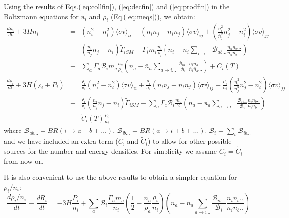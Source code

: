 \documentclass[preprint,notoc]{JHEP3}
\def\to{\rightarrow}
\def\to{\rightarrow}
\newcommand\Drv[2]{\frac{d #1}{d #2}}
\begin{document}
Using the results of Eqs.(\ref{eq:collfin}), (\ref{eq:decfin}) and
(\ref{eq:prodfin}) in the Boltzmann equations for $n_i$ and $\rho_i$
(Eq.(\ref{eq:meqs})), we obtain:
\begin{eqnarray}
\Drv{n_i}{t} + 3H n_i  & = &  \left( \bar{n}_i^2 - n_i^2 \right) \langle \sigma
v \rangle_{ii} +  \left( \bar{n}_i \bar{n}_j - n_i n_j \right) \langle \sigma
v \rangle_{ij} + \left(\frac{\bar{n}_i^2}{\bar{n}_j^2} n_j^2  - n_i^2 \right) \langle \sigma v \rangle_{jj} \nonumber
\\
& + & \left(\frac{\bar{n}_i}{\bar{n}_j} n_j  - n_i\right)  \tilde{\Gamma}_{iSM} - \Gamma_i m_i \frac{n_i}{\rho_i}\left(n_i - \bar{n}_i \sum_{i\to\ldots}
\mathcal{B}_{ab\ldots} \frac{n_a n_b \ldots}{\bar{n}_a \bar{n}_b \ldots} \right)
\nonumber
\\
& + & \sum_a 
\Gamma_a \mathcal{B}_i m_a \frac{n_a}{\rho_a} \left(n_a - \bar{n}_a \sum_{a \to
i\ldots} \frac{\mathcal{B}_{ib\ldots}}{\mathcal{B}_{i}} \frac{n_i n_b \ldots}{\bar{n}_i \bar{n}_b \ldots} \right)  + C_{i}(T) \label{eq:nieq} \\
\Drv{\rho_i}{t} + 3H (\rho_i + P_i) & = & \frac{\rho_i}{n_i} \left( \bar{n}_i^2 - n_i^2 \right) \langle \sigma
v \rangle_{ii} + \frac{\rho_i}{n_i}  \left( \bar{n}_i \bar{n}_j - n_i n_j \right) \langle \sigma
v \rangle_{ij} + \frac{\rho_i}{n_i} \left(\frac{\bar{n}_i^2}{\bar{n}_j^2} n_j^2  - n_i^2 \right) \langle \sigma v \rangle_{jj} \nonumber
\\
& + &\frac{\rho_i}{n_i}  \left(\frac{\bar{n}_i}{\bar{n}_j} n_j  - n_i\right)  \tilde{\Gamma}_{iSM} - \sum_a \Gamma_a  \mathcal{B}_i \frac{m_a}{2} \left( n_a -
 \bar{n}_a \sum_{a \to i\ldots}  \frac{\mathcal{B}_{ib\ldots}}{\mathcal{B}_{i}} \frac{n_i
 n_b..}{\bar{n}_i \bar{n}_b..} \right) \nonumber
\\
& + & \tilde{C}_{i}(T)
 \frac{\rho_i}{n_i}
\end{eqnarray}
where $\mathcal{B}_{ab\ldots} = BR(i \to a + b+ \ldots)$, $\mathcal{B}_{ib\ldots} =
BR(a \to i + b + \ldots)$, $\mathcal{B}_i = \sum_b \mathcal{B}_{ib\ldots}$ and
we have included an extra term ($C_i$ and $\tilde{C}_i$) to allow for other possible sources for the number and energy densities. 
For simplicity we assume $C_i = \tilde{C}_{i}$ from now on.


It is also convenient to use the above results to obtain a simpler equation for
$\rho_i/n_i$:
\begin{equation}
\Drv{\rho_i/n_i}{t} \equiv \Drv{R_i}{t} = -3 H \frac{P_i}{n_i} + \sum_{a}
\mathcal{B}_{i} \frac{\Gamma_a m_a}{n_i} \left( \frac{1}{2} - \frac{n_a}{\rho_a} \frac{\rho_i}{n_i} \right) \left(n_a -
\bar{n}_a \sum_{a \to i\ldots} \frac{\mathcal{B}_{ib\ldots}}{\mathcal{B}_{i}} \frac{n_i
 n_b..}{\bar{n}_i \bar{n}_b..}\right) \label{eq:Rieq}
\end{equation}
\end{document}
